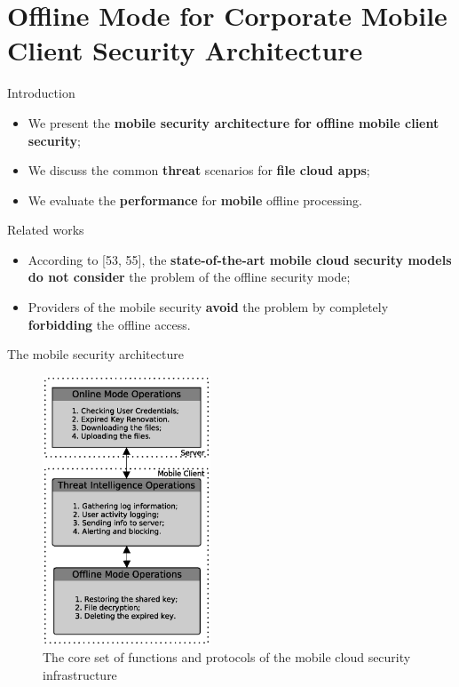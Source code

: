 \documentclass[newPxFont, numfooter, sectionpages]{beamer}
\begin{document}
\section{Offline Mode for Corporate Mobile Client Security Architecture}
\label{Blocks}
\begin{frame}[c]{Introduction}
	\begin{itemize}
		\item We present the \textbf{mobile security architecture for offline mobile client security};
		\item We discuss the common \textbf{threat} scenarios for \textbf{file cloud apps};
		\item We evaluate the \textbf{performance} for \textbf{mobile} offline processing.
	\end{itemize}
\end{frame}
\begin{frame}[c]{Related works}
	
	\begin{itemize}
		\item According to [53, 55], the \textbf{state-of-the-art mobile cloud security models do not consider} the problem of the offline security mode;
		\item Providers of the mobile security \textbf{avoid} the problem by completely \textbf{forbidding} the offline access.
	\end{itemize}
	
\end{frame}
\begin{frame}[c]{The mobile security architecture}
	
	\begin{figure}[h!]
		\centering
		\includegraphics[width=5cm]{../figures/fig01.eps}
		\caption{The core set of functions and protocols of the mobile cloud security infrastructure}
		\label{fig:3_01}
	\end{figure}
	
\end{frame}
\end{document}
